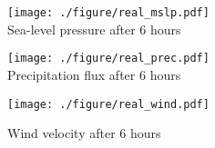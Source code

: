 \begin{figure}[tbh]
\begin{center}
  \texttt{[image: ./figure/real\_mslp.pdf]}\\
  \caption{Sea-level pressure after 6 hours}
  \label{fig:real_mslp}
\end{center}
\begin{center}
  \texttt{[image: ./figure/real\_prec.pdf]}\\
  \caption{Precipitation flux after 6 hours}
  \label{fig:real_prec}
\end{center}
\begin{center}
  \texttt{[image: ./figure/real\_wind.pdf]}\\
  \caption{Wind velocity after 6 hours}
  \label{fig:real_wind}
\end{center}
\end{figure}

